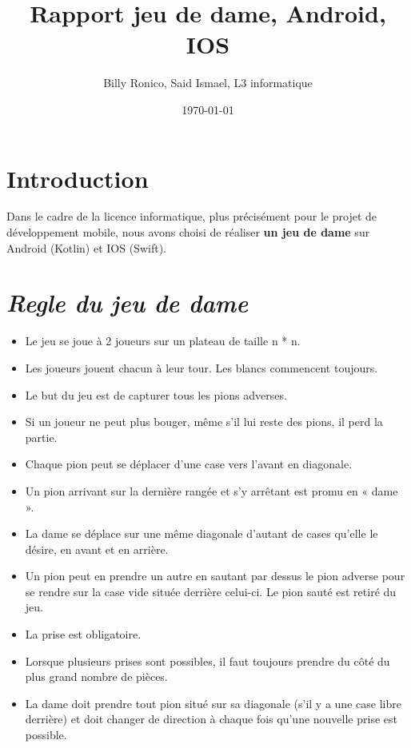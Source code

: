 \documentclass{article}
\title{Rapport jeu de dame, Android, IOS}
\author{Billy Ronico, Said Ismael, L3 informatique}
\date{\today}
\begin{document}
\maketitle %


\section{Introduction}
\label{section:intro} %

Dans le cadre de la licence informatique, plus précisément pour le projet de développement 
mobile, nous avons choisi de réaliser \textbf{un jeu de dame} sur Android (Kotlin) et IOS (Swift).

\section{\textit{Regle du jeu de dame}~\cite{regleJeuDame}} 

\begin{itemize}
  \item Le jeu se joue à 2 joueurs sur un plateau de taille n * n.
  \item Les joueurs jouent chacun à leur tour. Les blancs commencent toujours.
  \item Le but du jeu est de capturer tous les pions adverses. 
  \item Si un joueur ne peut plus bouger, même s'il lui reste des pions, il perd la partie. 
  \item Chaque pion peut se déplacer d'une case vers l'avant en diagonale. 
  \item Un pion arrivant sur la dernière rangée et s'y arrêtant est promu en « dame ».
  \item La dame se déplace sur une même diagonale d'autant de cases qu'elle le désire, en avant et en arrière.
  \item Un pion peut en prendre un autre en sautant par dessus le pion adverse
   pour se rendre sur la case vide située derrière celui-ci. Le pion sauté est retiré du jeu.
  \item La prise est obligatoire.
  \item Lorsque plusieurs prises sont possibles, 
  il faut toujours prendre du côté du plus grand nombre de pièces.
  \item La dame doit prendre tout pion situé sur sa diagonale 
  (s'il y a une case libre derrière) et doit changer de direction à chaque 
  fois qu'une  nouvelle prise est possible. 
\end{itemize}
\end{document}
